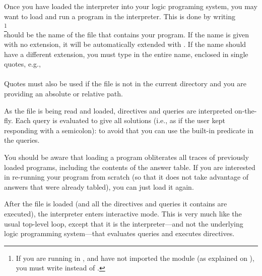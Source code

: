 %

Once you have loaded the interpreter into your logic programing system, you
may want to load and run a program in the interpreter. This is done by
writing\\
\ind{}%
\footnote{
  If you are running in \Eclipse{}, and have not imported the module 
  (as explained on ), you must write 
  instead of .
}\\
 should be the name of the file that contains your program.
If the name is given with no extension, it will be automatically extended
with .%
%
If the name should have a different extension, you must type in the entire
name, enclosed in single quotes, e.g.,\\
\ind{}\\
Quotes must also be used if the file is not in the current directory and you
are providing an absolute or relative path.

As the file is being read and loaded, directives and queries are interpreted
on-the-fly. Each query is evaluated to give all solutions (i.e., as if the
user kept responding with a semicolon): to avoid that you can use the
built-in predicate  in the queries.

You should be aware that loading a program obliterates all traces of
previously loaded programs, including the contents of the answer table.  If
you are interested in re-running your program from scratch (so that it does
not take advantage of answers that were already tabled), you can just load it
again.

\vfill %



%

After the file is loaded (and all the directives and queries it contains are
executed), the interpreter enters interactive mode.  This is very much like
the usual top-level loop, except that it is the interpreter---and not the
underlying logic programming system---that evaluates queries and executes
directives.


